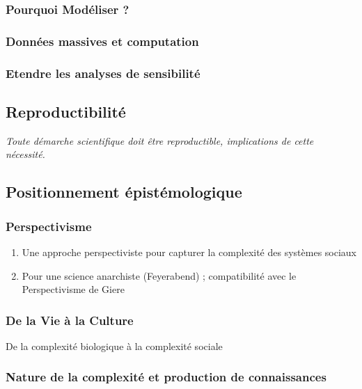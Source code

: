 \subsubsection{Pourquoi Modéliser ?}


\subsubsection{Données massives et computation}


\subsubsection{Etendre les analyses de sensibilité}



\subsection{Reproductibilité}

\textit{Toute démarche scientifique doit être reproductible, implications de cette nécessité.}





\subsection{Positionnement épistémologique}

\subsubsection{Perspectivisme}

\begin{enumerate}
	\item Une approche perspectiviste pour capturer la complexité des systèmes sociaux
	\item Pour une science anarchiste (Feyerabend) ; compatibilité avec le Perspectivisme de Giere
\end{enumerate}

\subsubsection{De la Vie à la Culture}

De la complexité biologique à la complexité sociale


\subsubsection{Nature de la complexité et production de connaissances}

